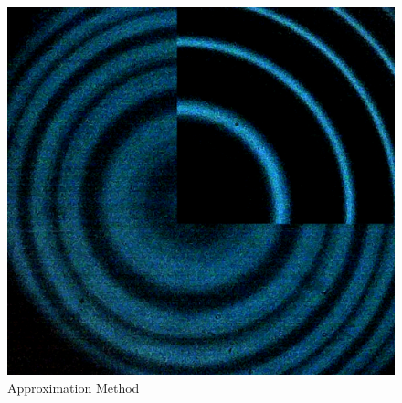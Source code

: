 \documentclass[a4paper,12pt,abstracton]{scrartcl}
\begin{document}
\begin{figure}[H]
    \centering
   \includegraphics[scale=0.2]{images/confrontoZAL.png}
    \caption{Approximation Method}
    \label{fig:approx}
\end{figure}

%
%
\end{document}
